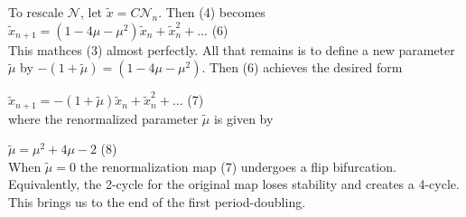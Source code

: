 \documentclass{article}
\newcommand\tab[1][1cm]{\hspace*{#1}}
\begin{document}
To rescale $\mathscr{N}$, let $\tilde{x}=C\mathscr{N}_{n}$. Then (4) becomes $\tilde{x}_{n+1}=(1-4\mu-\mu^{2})\tilde{x}_{n}+\tilde{x}^{2}_{n}+...$ \tab (6) \\

This mathces (3) almost perfectly. All that remains is to define a new parameter $\tilde{\mu}$ by $-(1+\tilde{\mu})=(1-4\mu - \mu^{2})$. Then (6) achieves the desired form \\ \tab \tab

$\tilde{x}_{n+1}=-(1+\tilde{\mu})\tilde{x}_{n}+\tilde{x}^{2}_{n}+...$ \tab (7) \\
where the renormalized parameter $\tilde{\mu}$ is given by \\ \tab \tab

$\tilde{\mu}=\mu^{2}+4\mu-2$ \tab (8) \\

When $\tilde{\mu}=0$ the renormalization map (7) undergoes a flip bifurcation. Equivalently, the 2-cycle for the original map loses stability and creates a 4-cycle. This brings us to the end of the first period-doubling.
\end{document}
